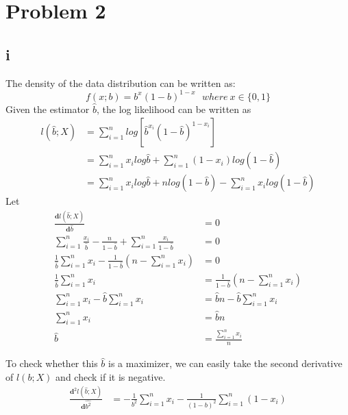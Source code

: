 \documentclass[twoside,11pt]{homework}
\begin{document}
\section*{Problem 2}
\subsection*{i}
The density of the data distribution can be written as:
\begin{equation*}
f(x;b) = b^{x}(1-b)^{1-x} ~~~where~x \in \{0, 1\}
\end{equation*}
Given the estimator $\hat{b}$, the log likelihood can be written as 
\begin{equation*}
\begin{split}
l(\hat{b}; X) &= \sum_{i=1}^{n} log [\hat{b}^{x_i}  (1-\hat{b})^{1-x_i}] \\
			&=  \sum_{i=1}^{n} x_{i}log\hat{b} + \sum_{i=1}^{n}  (1-x_i) log(1-\hat{b}) \\
            &= \sum_{i=1}^{n} x_i log\hat{b} + nlog(1-\hat{b}) - \sum_{i=1}^{n} x_i log(1-\hat{b})
\end{split}
\end{equation*}
Let
\begin{equation*}
\begin{split}
\frac{\textbf{d}l(\hat{b};X)}{\textbf{d}\hat{b}} &= 0 \\
\sum_{i=1}^{n} \frac{x_i}{\hat{b}} - \frac{n}{1-\hat{b}} + \sum_{i=1}^{n}\frac{x_i}{1-\hat{b}} &= 0 \\
\frac{1}{\hat{b}}\sum_{i=1}^{n} x_i - \frac{1}{1-\hat{b}} (n - \sum_{i=1}^{n} x_i) &= 0 \\
\frac{1}{\hat{b}}\sum_{i=1}^{n} x_i &= \frac{1}{1-\hat{b}} (n - \sum_{i=1}^{n} x_i)  \\
\sum_{i=1}^{n} x_i - \hat{b}\sum_{i=1}^{n} x_i &= \hat{b}n - \hat{b}\sum_{i=1}^{n} x_i \\
\sum_{i=1}^{n} x_i &= \hat{b} n \\
\hat{b} &= \frac{\sum_{i=1}^{n}x_i}{n}
\end{split}
\end{equation*}

To check whether this $\hat{b}$ is a maximizer, we can easily take the second derivative of $l(b; X)$ and check if it is negative. 
\begin{equation*}
\begin{split}
\frac{\textbf{d}^2l(\hat{b};X)}{\textbf{d}\hat{b^2}} &= -\frac{1}{b^2}\sum_{i=1}^{n}x_i - \frac{1}{(1-b)^2} \sum_{i=1}^{n} (1 - x_i)
\end{split}
\end{equation*}
\end{document}
